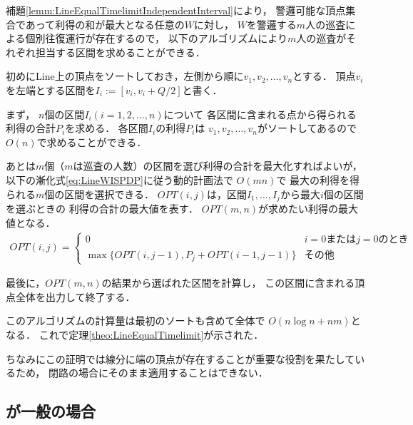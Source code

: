 補題\ref{lemm:LineEqualTimelimitIndependentInterval}により，
警邏可能な頂点集合であって利得の和が最大となる任意の$W$に対し，
$W$を警邏する$m$人の巡査による個別往復運行が存在するので，
以下のアルゴリズムにより$m$人の巡査がそれぞれ担当する区間を求めることができる．

初めにLine上の頂点をソートしておき，左側から順に$v_1,v_2,\ldots,v_n$とする．
頂点$v_i$を左端とする区間を$I_i := [v_i, v_i + Q/2]$と書く．

まず，
$n$個の区間$I_i (i = 1,2,\ldots, n)$について
各区間に含まれる点から得られる利得の合計$P_i$を求める．
各区間$I_i$の利得$P_i$は
$v_1,v_2,\ldots,v_n$がソートしてあるので$O(n)$で求めることができる．

あとは$m$個（$m$は巡査の人数）の区間を選び利得の合計を最大化すればよいが，
以下の漸化式\ref{eq:LineWISPDP}に従う動的計画法で
$O(mn)$で
最大の利得を得られる$m$個の区間を選択できる．
$OPT(i,j)$は，区間$I_1, \ldots, I_j$から最大$i$個の区間を選ぶときの
利得の合計の最大値を表す．
$OPT(m,n)$が求めたい利得の最大値となる．
\begin{align}
    \label{eq:LineWISPDP}
    OPT(i,j) = 
    \begin{cases}
        0 & \text{$i = 0$または$j = 0$のとき} \\
        \max \{
            OPT(i, j - 1), 
            P_j + OPT(i - 1, j - 1)
        \}
        & \text{その他}
    \end{cases}
\end{align}

最後に，$OPT(m,n)$の結果から選ばれた区間を計算し，
この区間に含まれる頂点全体を出力して終了する．

このアルゴリズムの計算量は最初のソートも含めて全体で
$O(n \log n + nm)$となる．
これで定理\ref{theo:LineEqualTimelimit}が示された．



ちなみにこの証明では線分に端の頂点が存在することが重要な役割を果たしているため，
閉路の場合にそのまま適用することはできない．





\subsection{{\timelimit}が一般の場合}
\label{subsec:LineDifferentTimelimit}

